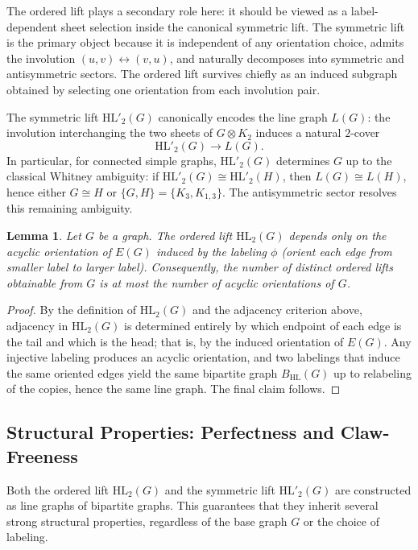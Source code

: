\documentclass[11pt]{article}
\newtheorem{lemma}{Lemma}
\newcommand{\HL}{\mathrm{HL}}
\theoremstyle{plain}
\newcommand{\BDC}[1]{#1\otimes K_2}
\begin{document}
The ordered lift plays a secondary role here: it should be viewed as a label-dependent sheet selection
inside the canonical symmetric lift. The symmetric lift is the primary object because it is independent
of any orientation choice, admits the involution $(u,v)\leftrightarrow(v,u)$, and naturally decomposes
into symmetric and antisymmetric sectors. The ordered lift survives chiefly as an induced subgraph
obtained by selecting one orientation from each involution pair.

The symmetric lift \(\HL'_2(G)\) canonically encodes the line graph \(L(G)\): the involution interchanging the two
sheets of \(\BDC{G}\) induces a natural \(2\)-cover
\[
\HL'_2(G)\to L(G).
\]
In particular, for connected simple graphs, \(\HL'_2(G)\) determines \(G\) up to the classical Whitney ambiguity:
if \(\HL'_2(G)\cong \HL'_2(H)\), then \(L(G)\cong L(H)\), hence either \(G\cong H\) or \(\{G,H\}=\{K_3,K_{1,3}\}\).
The antisymmetric sector resolves this remaining ambiguity.


\begin{lemma}\label{lem:ordered-lift-acyclic-orientation}
Let $G$ be a graph. The ordered lift $\mathrm{HL}_2(G)$ depends only on the acyclic orientation of
$E(G)$ induced by the labeling $\phi$ (orient each edge from smaller label to larger label).
Consequently, the number of distinct ordered lifts obtainable from $G$ is at most the number of
acyclic orientations of $G$.
\end{lemma}

\begin{proof}
By the definition of $\mathrm{HL}_2(G)$ and the adjacency criterion above, adjacency in
$\mathrm{HL}_2(G)$ is determined entirely by which endpoint of each edge is the tail and which is
the head; that is, by the induced orientation of $E(G)$. Any injective labeling produces an acyclic
orientation, and two labelings that induce the same oriented edges yield the same bipartite graph
$B_{\mathrm{HL}}(G)$ up to relabeling of the copies, hence the same line graph. The final claim
follows.
\end{proof}

\subsection{Structural Properties: Perfectness and Claw-Freeness}

Both the ordered lift \( \mathrm{HL}_2(G) \) and the symmetric lift \( \mathrm{HL}'_2(G) \) are constructed as line graphs of bipartite graphs. This guarantees that they inherit several strong structural properties, regardless of the base graph \( G \) or the choice of labeling.
\end{document}
